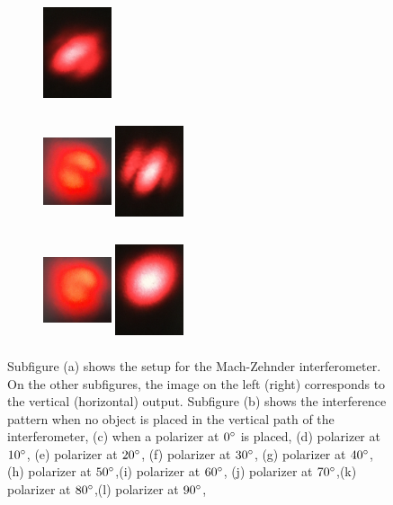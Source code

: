 \documentclass[12pt]{book}
\begin{document}
\begin{figure}[t!]
\begin{subfigure}[b]{0.3\linewidth}
\includegraphics[width=2cm,height=3cm]{images/fotos/32.jpg}
\caption{}
\end{subfigure}
\begin{subfigure}[b]{0.3\linewidth}
\centering
\includegraphics[width=2cm,height=3cm]{images/fotos/101.jpg}
\includegraphics[width=2cm,height=3cm]{images/fotos/22.jpg}
\caption{}
\end{subfigure}
\begin{subfigure}[b]{0.3\linewidth}
\centering
\includegraphics[width=2cm,height=3cm]{images/fotos/111.jpg}
\includegraphics[width=2cm,height=3cm]{images/fotos/12.jpg}
\caption{}
\end{subfigure}

\caption{ Subfigure (a) shows the setup for the Mach-Zehnder interferometer. On the other subfigures, the image on the left (right) corresponds to the vertical (horizontal) output. Subfigure (b) shows the interference pattern when no object is placed in the vertical path of the interferometer, (c) when a polarizer at $0\degree$ is placed, (d) polarizer at $10\degree$, (e) polarizer at $20\degree$, (f) polarizer at $30\degree$, (g) polarizer at $40\degree$, (h) polarizer at $50\degree$,(i) polarizer at $60\degree$, (j) polarizer at $70\degree$,(k) polarizer at $80\degree$,(l) polarizer at $90\degree$,}
\label{intensities2222}
\end{figure}
\end{document}
